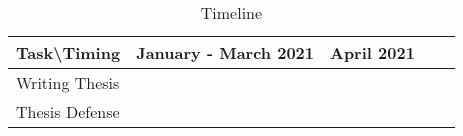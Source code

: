\begin{table}[h!]
\begin{center}
    \begin{tabular}{|l|l|l|l|l|}
    \hline
    Task\textbackslash{}Timing & January - March 2021                                      & April 2021                 \\ \hline
    Writing Thesis             & \cellcolor[HTML]{6665CD}{\color[HTML]{333333} } &                          \\ \hline
    Thesis Defense             &                                                 & \cellcolor[HTML]{67FD9A} \\ \hline
    \end{tabular}
\end{center}
\caption{Timeline}
\end{table}